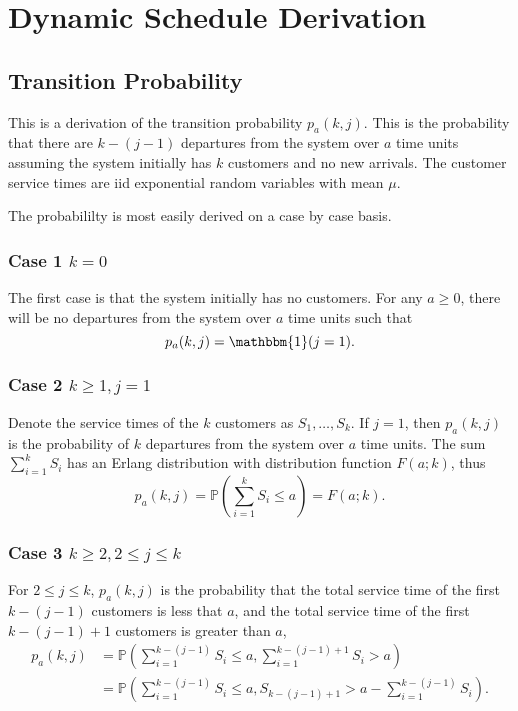 \chapter{Dynamic Schedule Derivation}
\section{Transition Probability}
This is a derivation of the transition probability $p_{a} (k, j)$. This is the probability that there are $k - (j - 1)$ departures from the system over $a$ time units assuming the system initially has $k$ customers and no new arrivals. The customer service times are iid exponential random variables with mean $\mu$.

The probabililty is most easily derived on a case by case basis.

\subsection{Case 1 $k = 0$}
The first case is that the system initially has no customers. For any $a \geq 0$, there will be no departures from the system over $a$ time units such that
\begin{equation}
	p_{a} (k, j) = \mathbbm{1} (j = 1).
\end{equation}

\subsection{Case 2 $k \geq 1, j = 1$}
Denote the service times of the $k$ customers as $S_{1}, \ldots, S_{k}$. If $j = 1$, then $p_{a} (k, j)$ is the probability of $k$ departures from the system over $a$ time units. The sum $\sum_{i = 1}^{k} S_{i}$ has an Erlang distribution with distribution function $F (a; k)$, thus
\begin{equation}
	p_{a} (k, j) = \mathbb{P} \left( \sum_{i = 1}^{k} S_{i} \leq a \right) = F (a; k).
\end{equation}

\subsection{Case 3 $k \geq 2, 2 \leq j \leq k$}
For $2 \leq j \leq k$, $p_{a} (k, j)$ is the probability that the total service time of the first $k - (j - 1)$ customers is less that $a$, and the total service time of the first $k - (j - 1) + 1$ customers is greater than $a$,
\begin{equation}
	\begin{split}
		p_{a} (k, j)
		& = \mathbb{P} \left( \sum_{i = 1}^{k - (j - 1)} S_{i} \leq a, \sum_{i = 1}^{k - (j - 1) + 1} S_{i} > a \right) \\
		& = \mathbb{P} \left( \sum_{i = 1}^{k - (j - 1)} S_{i} \leq a, S_{k - (j - 1) + 1} > a - \sum_{i = 1}^{k - (j - 1)} S_{i} \right).
	\end{split}
\end{equation}

